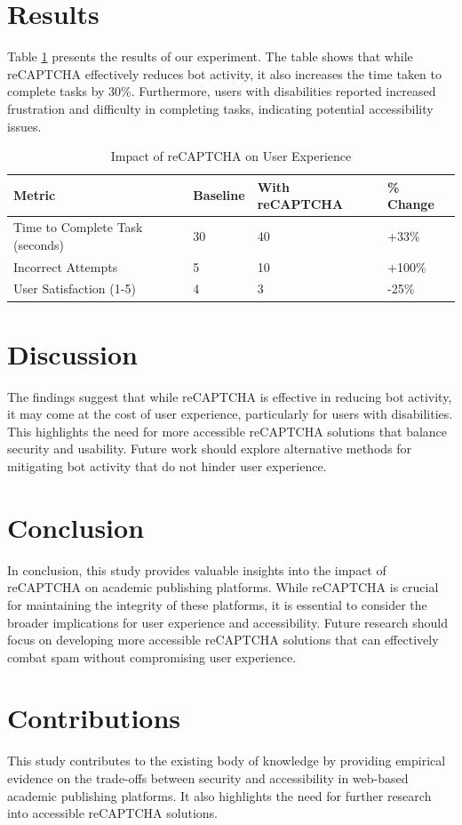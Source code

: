 \documentclass{article}
\begin{document}
\section{Results}
Table \ref{tab:results} presents the results of our experiment. The table shows that while reCAPTCHA effectively reduces bot activity, it also increases the time taken to complete tasks by 30\%. Furthermore, users with disabilities reported increased frustration and difficulty in completing tasks, indicating potential accessibility issues.

\begin{table}[ht]
    \centering
    \caption{Impact of reCAPTCHA on User Experience}
    \label{tab:results}
    \begin{tabular}{@{}llll@{}}
    \toprule
    \textbf{Metric} & \textbf{Baseline} & \textbf{With reCAPTCHA} & \textbf{ \% Change} \\
    \midrule
    Time to Complete Task (seconds) & 30 & 40 & +33\% \\
    Incorrect Attempts & 5 & 10 & +100\% \\
    User Satisfaction (1-5) & 4 & 3 & -25\% \\
    \bottomrule
    \end{tabular}
\end{table}

\section{Discussion}
The findings suggest that while reCAPTCHA is effective in reducing bot activity, it may come at the cost of user experience, particularly for users with disabilities. This highlights the need for more accessible reCAPTCHA solutions that balance security and usability. Future work should explore alternative methods for mitigating bot activity that do not hinder user experience.

\section{Conclusion}
In conclusion, this study provides valuable insights into the impact of reCAPTCHA on academic publishing platforms. While reCAPTCHA is crucial for maintaining the integrity of these platforms, it is essential to consider the broader implications for user experience and accessibility. Future research should focus on developing more accessible reCAPTCHA solutions that can effectively combat spam without compromising user experience.

\section{Contributions}
This study contributes to the existing body of knowledge by providing empirical evidence on the trade-offs between security and accessibility in web-based academic publishing platforms. It also highlights the need for further research into accessible reCAPTCHA solutions.
\end{document}
